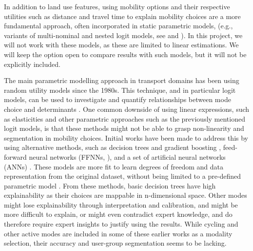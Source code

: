 \documentclass[sigconf, natbib=false, nonacm]{acmart}
\begin{document}
    In addition to land use features, using mobility options and their respective utilities such as distance and travel time to explain mobility choices are a more fundamental approach, often incorporated in static parametric models, (e.g., variants of multi-nominal and nested logit models, see \parencite{koppelman_self_2006} and \parencite{ortuzar_modelling_2011}). In this project, we will not work with these models, as these are limited to linear estimations. We will keep the option open to compare results with such models, but it will not be explicitly included. 

    The main parametric modelling approach in transport domains has been using random utility models since the 1980s. This technique, and in particular logit models, can be used to investigate and quantify relationships between mode choice and determinants \cite{lee_comparison_2018}. One common downside of using linear expressions, such as elasticities and other parametric approaches such as the previously mentioned logit models, is that these methods might not be able to grasp non-linearity and segmentation in mobility choices. Initial works have been made to address this by using alternative methods, such as decision trees and gradient boosting \parencite{ding_applying_2018}, feed-forward neural networks (FFNNs, \cite{bakri_inzichten_2023}), and a set of artificial neural networks (ANNs) \parencite{lee_comparison_2018}. These models are more fit to learn degrees of freedom and data representation from the original dataset, without being limited to a pre-defined parametric model \parencite{bakri_inzichten_2023}. From these methods, basic decision trees have high explainability as their choices are mappable in n-dimensional space. Other modes might lose explainability through interpretation and calibration, and might be more difficult to explain, or might even contradict expert knowledge, and do therefore require expert insights to justify using the results. While cycling and other active modes are included in some of these earlier works as a modality selection, their accuracy and user-group segmentation seems to be lacking. 
\end{document}
